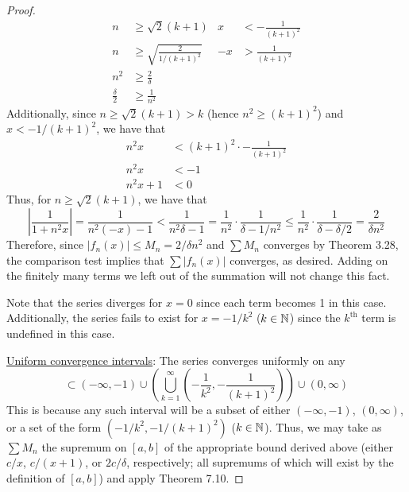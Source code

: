 \documentclass[../psets.tex]{subfiles}
\begin{document}
\begin{enumerate}[label={\textbf{\arabic*.}}]
\begin{proof}
        \begin{align*}
            n &\geq \sqrt{2}(k+1)&
                x &< -\frac{1}{(k+1)^2}\\
            n &\geq \sqrt{\frac{2}{1/(k+1)^2}}&
                -x &> \frac{1}{(k+1)^2}\\
            n^2 &\geq \frac{2}{\delta}\\
            \frac{\delta}{2} &\geq \frac{1}{n^2}
        \end{align*}
        Additionally, since $n\geq\sqrt{2}(k+1)>k$ (hence $n^2\geq(k+1)^2$) and $x<-1/(k+1)^2$, we have that
        \begin{align*}
            n^2x &< (k+1)^2\cdot -\frac{1}{(k+1)^2}\\
            n^2x &< -1\\
            n^2x+1 &< 0
        \end{align*}
        Thus, for $n\geq\sqrt{2}(k+1)$, we have that
        \begin{equation*}
            \left| \frac{1}{1+n^2x} \right| = \frac{1}{n^2(-x)-1}
            < \frac{1}{n^2\delta-1}
            = \frac{1}{n^2}\cdot\frac{1}{\delta-1/n^2}
            \leq \frac{1}{n^2}\cdot\frac{1}{\delta-\delta/2}
            = \frac{2}{\delta n^2}
        \end{equation*}
        Therefore, since $|f_n(x)|\leq M_n=2/\delta n^2$ and $\sum M_n$ converges by Theorem 3.28, the comparison test implies that $\sum|f_n(x)|$ converges, as desired. Adding on the finitely many terms we left out of the summation will not change this fact.\par
        Note that the series diverges for $x=0$ since each term becomes 1 in this case. Additionally, the series fails to exist for $x=-1/k^2$ ($k\in\mathbb{N}$) since the $k^\text{th}$ term is undefined in this case.\par\medskip
        \underline{Uniform convergence intervals}: The series converges uniformly on any
        \begin{equation*}
            [a,b] \subset (-\infty,-1)\cup\left( \bigcup_{k=1}^\infty\left( -\frac{1}{k^2},-\frac{1}{(k+1)^2} \right) \right)\cup(0,\infty)
        \end{equation*}
        This is because any such interval will be a subset of either $(-\infty,-1)$, $(0,\infty)$, or a set of the form $(-1/k^2,-1/(k+1)^2)$ ($k\in\mathbb{N}$). Thus, we may take as $\sum M_n$ the supremum on $[a,b]$ of the appropriate bound derived above (either $c/x$, $c/(x+1)$, or $2c/\delta$, respectively; all supremums of which will exist by the definition of $[a,b]$) and apply Theorem 7.10.\par\medskip

\end{proof}
\end{enumerate}
\end{document}
